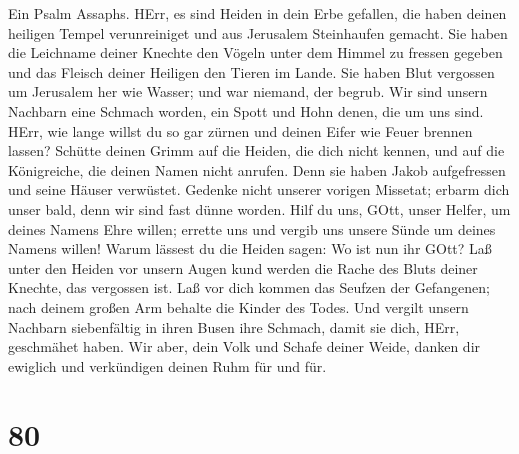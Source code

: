  Ein Psalm Assaphs. HErr, es sind Heiden in dein Erbe
gefallen, die haben deinen heiligen Tempel verunreiniget und aus
Jerusalem Steinhaufen gemacht.  Sie haben die Leichname
deiner Knechte den Vögeln unter dem Himmel zu fressen gegeben und das
Fleisch deiner Heiligen den Tieren im Lande.  Sie haben Blut
vergossen um Jerusalem her wie Wasser; und war niemand, der begrub.
 Wir sind unsern Nachbarn eine Schmach worden, ein Spott und
Hohn denen, die um uns sind.  HErr, wie lange willst du so
gar zürnen und deinen Eifer wie Feuer brennen lassen? 
Schütte deinen Grimm auf die Heiden, die dich nicht kennen, und auf die
Königreiche, die deinen Namen nicht anrufen.  Denn sie haben
Jakob aufgefressen und seine Häuser verwüstet.  Gedenke
nicht unserer vorigen Missetat; erbarm dich unser bald, denn wir sind
fast dünne worden.  Hilf du uns, GOtt, unser Helfer, um
deines Namens Ehre willen; errette uns und vergib uns unsere Sünde um
deines Namens willen!  Warum lässest du die Heiden sagen:
Wo ist nun ihr GOtt? Laß unter den Heiden vor unsern Augen kund werden
die Rache des Bluts deiner Knechte, das vergossen ist.  Laß
vor dich kommen das Seufzen der Gefangenen; nach deinem großen Arm
behalte die Kinder des Todes.  Und vergilt unsern Nachbarn
siebenfältig in ihren Busen ihre Schmach, damit sie dich, HErr,
geschmähet haben.  Wir aber, dein Volk und Schafe deiner
Weide, danken dir ewiglich und verkündigen deinen Ruhm für und für.

\hypertarget{section-79}{%
\section{80}\label{section-79}}

